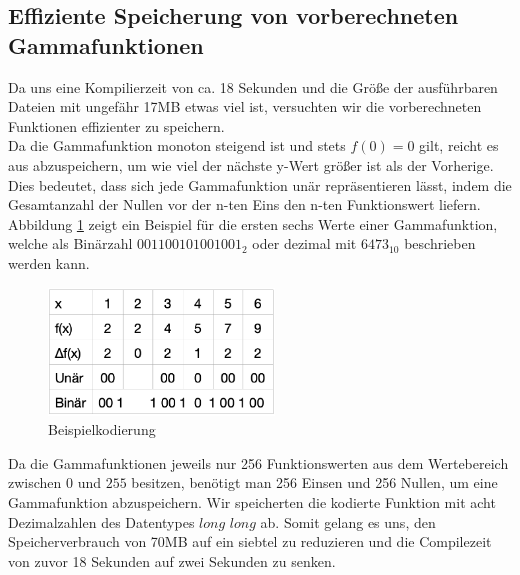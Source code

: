 \documentclass[course=erap]{aspdoc}
\begin{document}
	\subsection{Effiziente Speicherung von vorberechneten Gammafunktionen}
	Da uns eine Kompilierzeit von ca. 18 Sekunden und die Größe der ausführbaren Dateien mit ungefähr 17MB etwas viel ist, versuchten wir die vorberechneten Funktionen effizienter zu speichern.
	\\
	\newline
	\noindent
	Da die Gammafunktion monoton steigend ist und stets $f(0)=0$ gilt, reicht es aus abzuspeichern, um wie viel der nächste y-Wert größer ist als der Vorherige. Dies bedeutet, dass sich jede Gammafunktion unär repräsentieren lässt, indem die Gesamtanzahl der Nullen vor der n-ten Eins den n-ten Funktionswert liefern. Abbildung \ref{KompremierungBeispiel} zeigt ein Beispiel für die ersten sechs Werte einer Gammafunktion, welche als Binärzahl $001100101001001_{2}$ oder dezimal mit $6473_{10}$ beschrieben werden kann.

	\noindent
	\begin{figure}
        \includegraphics[width=6cm]{Images/CompressionOfFunctions.png}
         \caption{Beispielkodierung}
         \label{KompremierungBeispiel}
    \end{figure}
	Da die Gammafunktionen jeweils nur 256 Funktionswerten aus dem Wertebereich zwischen $0$ und $255$ besitzen, benötigt man 256 Einsen und 256 Nullen, um eine Gammafunktion abzuspeichern. Wir speicherten die kodierte Funktion mit acht Dezimalzahlen des Datentypes $long$ $long$ ab. Somit gelang es uns, den Speicherverbrauch von 70MB auf ein siebtel zu reduzieren und die Compilezeit von zuvor 18 Sekunden auf zwei Sekunden zu senken.
\end{document}
